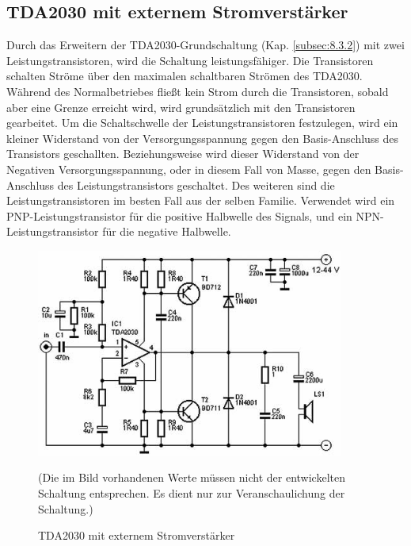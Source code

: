 \subsection{TDA2030 mit externem Stromverstärker}\label{subsec:8.3.3}
Durch das Erweitern der TDA2030-Grundschaltung (Kap. \ref{subsec:8.3.2}) mit zwei Leistungstransistoren, wird die Schaltung leistungsfähiger.
Die Transistoren schalten Ströme über den maximalen schaltbaren Strömen des TDA2030. Während des Normalbetriebes fließt kein Strom durch die Transistoren, sobald aber eine Grenze erreicht wird, wird grundsätzlich mit den Transistoren gearbeitet.
Um die Schaltschwelle der Leistungstransistoren festzulegen, wird ein kleiner Widerstand von der Versorgungsspannung gegen den Basis-Anschluss des Transistors geschallten.
Beziehungsweise wird dieser Widerstand von der Negativen Versorgungsspannung, oder in diesem Fall von Masse, gegen den Basis-Anschluss des Leistungstransistors geschaltet.
Des weiteren sind die Leistungstransistoren im besten Fall aus der selben Familie.
Verwendet wird ein PNP-Leistungstransistor für die positive Halbwelle des Signals, und ein NPN-Leistungstransistor für die negative Halbwelle.
\begin{figure} [H]
	\centering
	\includegraphics[width=0.9\textwidth]{img/Grundlagen/TDA2030/TDA2030-Leistungstransschaltung.jpg}
	\caption[TDA2030 mit externem Stromverstärker]{TDA2030 mit externem Stromverstärker\footnotemark}
	\text (Die im Bild vorhandenen Werte müssen nicht der entwickelten Schaltung entsprechen. Es dient nur zur Veranschaulichung der Schaltung.)
	\label {fig:8.3.3.1}
\end{figure}

